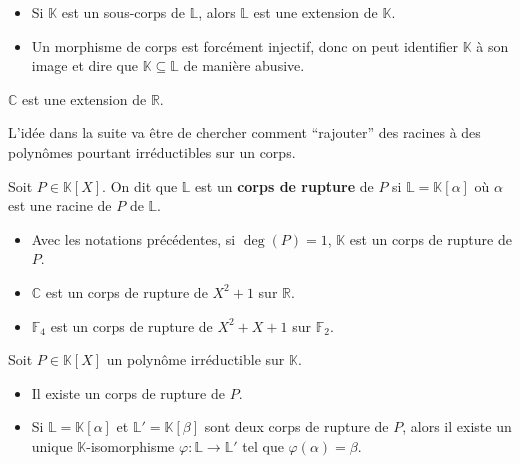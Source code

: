 	\begin{remark}
		\begin{itemize}
			\item Si $\mathbb{K}$ est un sous-corps de $\mathbb{L}$, alors $\mathbb{L}$ est une extension de $\mathbb{K}$.
			\item Un morphisme de corps est forcément injectif, donc on peut identifier $\mathbb{K}$ à son image et dire que $\mathbb{K} \subseteq \mathbb{L}$ de manière abusive.
		\end{itemize}
	\end{remark}

	\begin{example}
		$\mathbb{C}$ est une extension de $\mathbb{R}$.
	\end{example}

	L'idée dans la suite va être de chercher comment ``rajouter'' des racines à des polynômes pourtant irréductibles sur un corps.


	\begin{definition}
		Soit $P \in \mathbb{K}[X]$. On dit que $\mathbb{L}$ est un \textbf{corps de rupture} de $P$ si $\mathbb{L} = \mathbb{K}[\alpha]$ où $\alpha$ est une racine de $P$ de $\mathbb{L}$.
	\end{definition}

	\begin{example}
		\begin{itemize}
			\item Avec les notations précédentes, si $\deg(P) = 1$, $\mathbb{K}$ est un corps de rupture de $P$.
			\item $\mathbb{C}$ est un corps de rupture de $X^2+1$ sur $\mathbb{R}$.
			\item $\mathbb{F}_4$ est un corps de rupture de $X^2+X+1$ sur $\mathbb{F}_2$.
		\end{itemize}
	\end{example}

	\begin{theorem}
		Soit $P \in \mathbb{K}[X]$ un polynôme irréductible sur $\mathbb{K}$.
		\begin{itemize}
			\item Il existe un corps de rupture de $P$.
			\item Si $\mathbb{L} = \mathbb{K}[\alpha]$ et $\mathbb{L}' = \mathbb{K}[\beta]$ sont deux corps de rupture de $P$, alors il existe un unique $\mathbb{K}$-isomorphisme $\varphi : \mathbb{L} \rightarrow \mathbb{L}'$ tel que $\varphi(\alpha) = \beta$.
		\end{itemize}
	\end{theorem}

